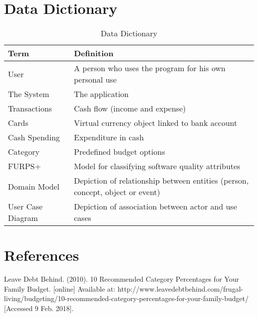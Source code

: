 \documentclass[12pt]{article}
\begin{document}
\clearpage


\section{Data Dictionary}

\begin{table}[H]
\begin{center}
\begin{tabular} {|p{3.5cm}|p{11.9cm}|}

\hline \textbf{Term} & \textbf{Definition} \\
\hline User & A person who uses the program for his own personal use \\
\hline The System  & The application\\
\hline Transactions & Cash flow (income and expense)\\
\hline Cards & Virtual currency object linked to bank account\\
\hline Cash Spending & Expenditure in cash\\
\hline Category & Predefined budget options \\
\hline FURPS+ & Model for classifying software quality attributes\\
\hline Domain Model & Depiction of relationship between entities (person, concept, object or event) \\
\hline User Case Diagram & Depiction of association between actor and use cases \\
\hline
\end{tabular}
\caption{Data Dictionary}
\end{center}
\end{table}

\section{References}
Leave Debt Behind. (2010). 10 Recommended Category Percentages for Your Family Budget. [online] Available at: http://www.leavedebtbehind.com/frugal-living/budgeting/10-recommended-category-percentages-for-your-family-budget/ [Accessed 9 Feb. 2018].

\appendix
\end{document}
